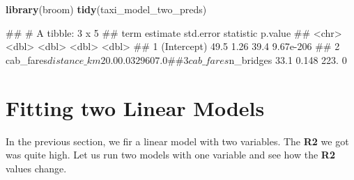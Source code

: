 \documentclass[
]{book}
\newenvironment{Shaded}{\begin{snugshade}}{\end{snugshade}}
\newcommand{\FunctionTok}[1]{\textcolor[rgb]{0.13,0.29,0.53}{\textbf{#1}}}
\newcommand{\NormalTok}[1]{#1}
\newcommand{\OtherTok}[1]{\textcolor[rgb]{0.56,0.35,0.01}{#1}}
\newcommand{\SpecialCharTok}[1]{\textcolor[rgb]{0.81,0.36,0.00}{\textbf{#1}}}
\begin{document}
\begin{Shaded}
\begin{Highlighting}[]
\FunctionTok{library}\NormalTok{(broom)}
\FunctionTok{tidy}\NormalTok{(taxi\_model\_two\_preds)}
\end{Highlighting}
\end{Shaded}

\begin{Shaded}
\begin{Highlighting}[]
\NormalTok{\#\# \# A tibble: 3 x 5}
\NormalTok{\#\#   term                  estimate std.error statistic   p.value}
\NormalTok{\#\#   \textless{}chr\textgreater{}                    \textless{}dbl\textgreater{}     \textless{}dbl\textgreater{}     \textless{}dbl\textgreater{}     \textless{}dbl\textgreater{}}
\NormalTok{\#\# 1 (Intercept)               49.5    1.26        39.4 9.67e{-}206}
\NormalTok{\#\# 2 cab\_fares$distance\_km     20.0    0.0329     607.  0        }
\NormalTok{\#\# 3 cab\_fares$n\_bridges       33.1    0.148      223.  0}
\end{Highlighting}
\end{Shaded}

\section{Fitting two Linear Models}\label{fitting-two-linear-models}

In the previous section, we fir a linear model with two variables. The \textbf{R2} we got was quite high. Let us run two models with one variable and see how the \textbf{R2} values change.

\begin{Shaded}
\end{Shaded}

\begin{Shaded}
\end{Shaded}
\end{document}
